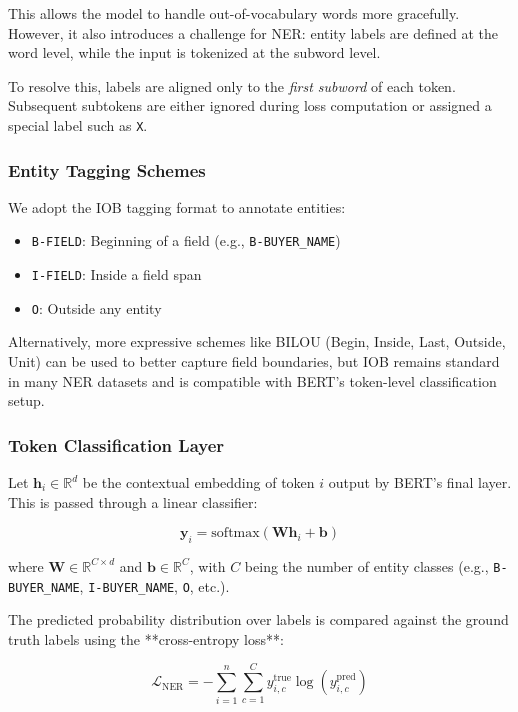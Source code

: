 \documentclass{article}
\begin{document}
This allows the model to handle out-of-vocabulary words more gracefully. However, it also introduces a challenge for NER: entity labels are defined at the word level, while the input is tokenized at the subword level.

To resolve this, labels are aligned only to the \emph{first subword} of each token. Subsequent subtokens are either ignored during loss computation or assigned a special label such as \texttt{X}.

\subsubsection{Entity Tagging Schemes}

We adopt the IOB tagging format to annotate entities:
\begin{itemize}
    \item \texttt{B-FIELD}: Beginning of a field (e.g., \texttt{B-BUYER\_NAME})
    \item \texttt{I-FIELD}: Inside a field span
    \item \texttt{O}: Outside any entity
\end{itemize}

Alternatively, more expressive schemes like BILOU (Begin, Inside, Last, Outside, Unit) can be used to better capture field boundaries, but IOB remains standard in many NER datasets and is compatible with BERT’s token-level classification setup.

\subsubsection{Token Classification Layer}

Let $\mathbf{h}_i \in \mathbb{R}^d$ be the contextual embedding of token $i$ output by BERT's final layer. This is passed through a linear classifier:

\[
\mathbf{y}_i = \text{softmax}(\mathbf{W} \mathbf{h}_i + \mathbf{b})
\]

where $\mathbf{W} \in \mathbb{R}^{C \times d}$ and $\mathbf{b} \in \mathbb{R}^C$, with $C$ being the number of entity classes (e.g., \texttt{B-BUYER\_NAME}, \texttt{I-BUYER\_NAME}, \texttt{O}, etc.).

The predicted probability distribution over labels is compared against the ground truth labels using the **cross-entropy loss**:

\[
\mathcal{L}_{\text{NER}} = -\sum_{i=1}^{n} \sum_{c=1}^{C} y_{i,c}^{\text{true}} \log(y_{i,c}^{\text{pred}})
\]
\end{document}
